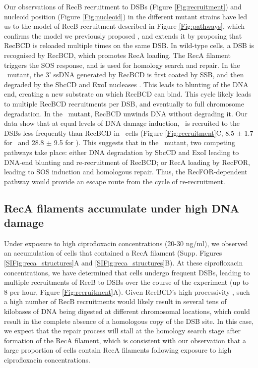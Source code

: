 Our observations of RecB recruitment to DSBs (Figure \ref{Fig:recruitment}) and nucleoid position (Figure \ref{Fig:nucleoid}) in the different mutant strains have led us to the model of RecB recruitment described in Figure \ref{Fig:pathways}, which confirms the model we previously proposed \cite{Lepore2025}, and extends it by proposing that RecBCD is reloaded multiple times on the same DSB. In wild-type cells, a DSB is recognised by RecBCD, which promotes RecA loading. The RecA filament triggers the SOS response, and is used for homology search and repair. In the \dreca\ mutant, the 3' ssDNA generated by RecBCD is first coated by SSB, and then degraded by the SbcCD and ExoI nucleases \cite{Zahradka2009}. This leads to blunting of the DNA end, creating a new substrate on which RecBCD can bind. This cycle likely leads to multiple RecBCD recruitments per DSB, and eventually to full chromosome degradation. In the \geneteneighty\ mutant, RecBCD unwinds DNA without degrading it. Our data show that at equal levels of DNA damage induction, \teneighty\ is recruited to the DSBs less frequently than RecBCD in \dreca\ cells (Figure \ref{Fig:recruitment}C, 8.5 $\pm$ 1.7 for \teneighty\ and 28.8 $\pm$ 9.5 for \dreca). This suggests that in the \geneteneighty\ mutant, two competing pathways take place: either DNA degradation by SbcCD and ExoI leading to DNA-end blunting and re-recruitment of RecBCD; or RecA loading by RecFOR, leading to SOS induction and homologous repair. Thus, the RecFOR-dependent pathway would provide an escape route from the cycle of re-recruitment.

\subsection*{RecA filaments accumulate under high DNA damage}
Under exposure to high ciprofloxacin concentrations (20-30 ng/ml), we observed an accumulation of cells that contained a RecA filament (Supp. Figures \ref{SIFig:reca_structures}A and \ref{SIFig:reca_structures}B). At these ciprofloxacin concentrations, we have determined that cells undergo frequent DSBs, leading to multiple recruitments of RecB to DSBs over the course of the experiment (up to 8 per hour, Figure \ref{Fig:recruitment}A). Given RecBCD's high processivity \cite{Wiktor2018}, such a high number of RecB recruitments would likely result in several tens of kilobases of DNA being digested at different chromosomal locations, which could result in the complete absence of a homologous copy of the DSB site. In this case, we expect that the repair process will stall at the homology search stage after formation of the RecA filament, which is consistent with our observation that a large proportion of cells contain RecA filaments following exposure to high ciprofloxacin concentrations.

